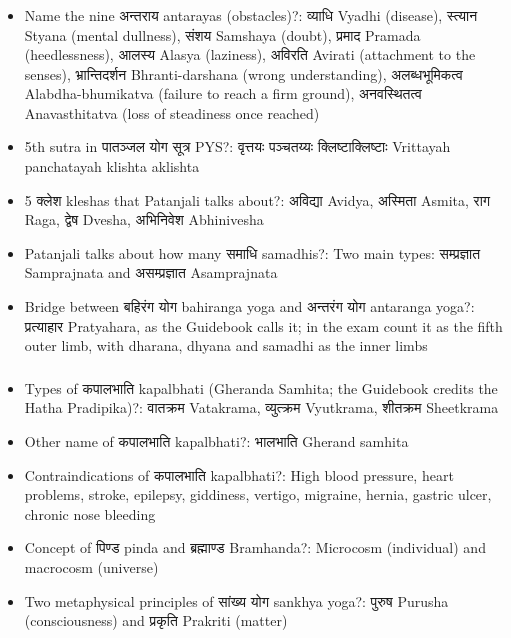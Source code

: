 \begin{frame}[fragile]\frametitle{}
\begin{itemize}
\item Name the nine अन्तराय antarayas (obstacles)?: व्याधि Vyadhi (disease), स्त्यान Styana (mental dullness), संशय Samshaya (doubt), प्रमाद Pramada (heedlessness), आलस्य Alasya (laziness), अविरति Avirati (attachment to the senses), भ्रान्तिदर्शन Bhranti-darshana (wrong understanding), अलब्धभूमिकत्व Alabdha-bhumikatva (failure to reach a firm ground), अनवस्थितत्व Anavasthitatva (loss of steadiness once reached)
\item 5th sutra in पातञ्जल योग सूत्र PYS?: वृत्तयः पञ्चतय्यः क्लिष्टाक्लिष्टाः Vrittayah panchatayah klishta aklishta
\item 5 क्लेश kleshas that Patanjali talks about?: अविद्या Avidya, अस्मिता Asmita, राग Raga, द्वेष Dvesha, अभिनिवेश Abhinivesha
\item Patanjali talks about how many समाधि samadhis?: Two main types: सम्प्रज्ञात Samprajnata and असम्प्रज्ञात Asamprajnata
\item Bridge between बहिरंग योग bahiranga yoga and अन्तरंग योग antaranga yoga?: प्रत्याहार Pratyahara, as the Guidebook calls it; in the exam count it as the fifth outer limb, with dharana, dhyana and samadhi as the inner limbs
\end{itemize}
\end{frame}

\begin{frame}[fragile]\frametitle{}
\begin{itemize}
\item Types of कपालभाति kapalbhati (Gheranda Samhita; the Guidebook credits the Hatha Pradipika)?: वातक्रम Vatakrama, व्युत्क्रम Vyutkrama, शीतक्रम Sheetkrama
\item Other name of कपालभाति kapalbhati?: भालभाति Gherand samhita
\item Contraindications of कपालभाति kapalbhati?: High blood pressure, heart problems, stroke, epilepsy, giddiness, vertigo, migraine, hernia, gastric ulcer, chronic nose bleeding
\item Concept of पिण्ड pinda and ब्रह्माण्ड Bramhanda?: Microcosm (individual) and macrocosm (universe)
\item Two metaphysical principles of सांख्य योग sankhya yoga?: पुरुष Purusha (consciousness) and प्रकृति Prakriti (matter)
\end{itemize}
\end{frame}

